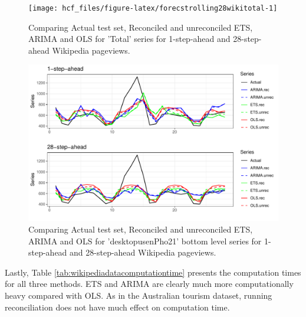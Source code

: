 \documentclass[11pt,a4paper,]{article}
\begin{document}
\begin{figure}

{\centering \texttt{[image: hcf\_files/figure-latex/forecstrolling28wikitotal-1]} 

}

\caption{Comparing Actual test set, Reconciled and unreconciled ETS, ARIMA and OLS for 'Total' series for 1-step-ahead and 28-step-ahead Wikipedia pageviews.}\label{fig:forecstrolling28wikitotal}
\end{figure}

\begin{figure}

{\centering \includegraphics[width=1\linewidth]{hcf_files/figure-latex/forecstrolling28wiki-1} 

}

\caption{Comparing Actual test set, Reconciled and unreconciled ETS, ARIMA and OLS for 'desktopusenPho21' bottom level series for 1-step-ahead and 28-step-ahead Wikipedia pageviews.}\label{fig:forecstrolling28wiki}
\end{figure}

Lastly, Table \ref{tab:wikipediadatacomputationtime} presents the
computation times for all three methods. ETS and ARIMA are clearly much
more computationally heavy compared with OLS. As in the Australian
tourism dataset, running reconciliation does not have much effect on
computation time.
\end{document}
